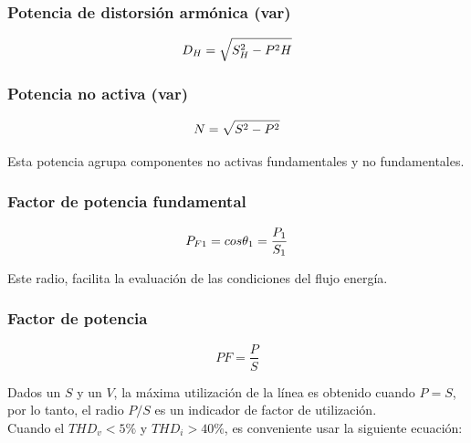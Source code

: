 \subsubsection{Potencia de distorsión armónica (var)}

\begin{equation}\label{EQ31}
D_{H}=\sqrt{S^2_{H}-P^2{H}}\\
\end{equation}

\subsubsection{Potencia no activa (var)}

\begin{equation}\label{EQ32}
N=\sqrt{S^2-P^2}\\
\end{equation}

Esta potencia agrupa componentes no activas fundamentales y no fundamentales.\cite{A30}\\

\subsubsection{Factor de potencia fundamental}

\begin{equation}
P_{F1}=cos \theta_{1} = \frac{P_{1}}{S_{1}}\\
\end{equation}

Este radio, facilita la evaluación de las condiciones del flujo energía.\cite{A30}\\

\subsubsection{Factor de potencia}

\begin{equation}\label{EQ33}
PF=\frac{P}{S}
\end{equation}

Dados un $S$ y un $V$, la máxima utilización de la línea es obtenido cuando $P=S$, por lo tanto, el radio $P/S$ es un indicador de factor de utilización.\cite{A30}\\

Cuando el $THD_{v}<5\%$ y $THD_{i}>40\%$, es conveniente usar la siguiente ecuación:\\

